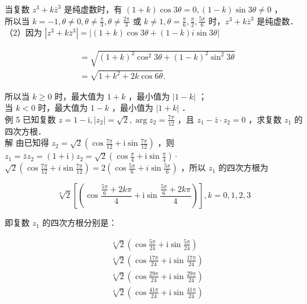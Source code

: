 \documentclass[10pt]{article}
\begin{document}
当复数 \(z^{3}+k \bar{z}^{3}\) 是纯虚数时，有 \((1+k) \cos 3 \theta=0,(1-k) \sin 3 \theta \neq 0\) ，\\
所以当 \(k=-1, \theta \neq 0, \theta \neq \frac{\pi}{3}, \theta \neq \frac{2 \pi}{3}\) 或 \(k \neq 1, \theta=\frac{\pi}{6}, \frac{\pi}{2}, \frac{5 \pi}{6}\) 时，\(z^{3}+k \bar{z}^{3}\) 是纯虚数．\\
（2）因为 \(\left|z^{3}+k \bar{z}^{3}\right|=|(1+k) \cos 3 \theta+(1-k) i \sin 3 \theta|\)

\[
\begin{aligned}
& =\sqrt{(1+k)^{2} \cos ^{2} 3 \theta+(1-k)^{2} \sin ^{2} 3 \theta} \\
& =\sqrt{1+k^{2}+2 k \cos 6 \theta} .
\end{aligned}
\]

所以当 \(k \geqslant 0\) 时，最大值为 \(1+k\) ，最小值为 \(|1-k|\) ；\\
当 \(k<0\) 时，最大值为 \(1-k\) ，最小值为 \(|1+k|\) ．\\
例 5 已知复数 \(z=1-\mathrm{i},\left|z_{2}\right|=\sqrt{2}, \arg z_{2}=\frac{7 \pi}{12}\) ，且 \(z_{1}-\bar{z} \cdot z_{2}=0\) ，求复数 \(z_{1}\) 的四次方根．\\
解 由已知得 \(z_{2}=\sqrt{2}\left(\cos \frac{7 \pi}{12}+\mathrm{i} \sin \frac{7 \pi}{12}\right)\) ，则 \(z_{1}=\bar{z} z_{2}=(1+\mathrm{i}) z_{2}=\sqrt{2}\left(\cos \frac{\pi}{4}+\mathrm{i} \sin \frac{\pi}{4}\right) \cdot\) \(\sqrt{2}\left(\cos \frac{7 \pi}{12}+i \sin \frac{7 \pi}{12}\right)=2\left(\cos \frac{5 \pi}{6}+i \sin \frac{5 \pi}{6}\right)\) ，所以 \(z_{1}\) 的四次方根为

\[
\sqrt[4]{2}\left[\left(\cos \frac{\frac{5 \pi}{6}+2 k \pi}{4}+\mathrm{i} \sin \frac{\frac{5 \pi}{6}+2 k \pi}{4}\right)\right], k=0,1,2,3
\]

即复数 \(z_{1}\) 的四次方根分别是：

\[
\begin{aligned}
& \sqrt[4]{2}\left(\cos \frac{5 \pi}{24}+\mathrm{i} \sin \frac{5 \pi}{24}\right) \\
& \sqrt[4]{2}\left(\cos \frac{17 \pi}{24}+\mathrm{i} \sin \frac{17 \pi}{24}\right) \\
& \sqrt[4]{2}\left(\cos \frac{29 \pi}{24}+\mathrm{i} \sin \frac{29 \pi}{24}\right) \\
& \sqrt[4]{2}\left(\cos \frac{41 \pi}{24}+\mathrm{i} \sin \frac{41 \pi}{24}\right)
\end{aligned}
\]
\end{document}
